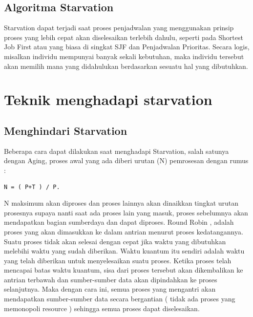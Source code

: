 \subsection{Algoritma Starvation}
Starvation dapat terjadi saat proses penjadwalan yang menggunakan prinsip proses yang lebih cepat akan diselesaikan terlebih dahulu, seperti pada Shortest Job First atau yang biasa di singkat SJF dan Penjadwalan Prioritas.
Secara logis, misalkan individu mempunyai banyak sekali kebutuhan, maka individu tersebut akan memilih mana yang didahulukan berdasarkan sesuatu hal yang dibutuhkan.
\section{Teknik menghadapi starvation}
\subsection {Menghindari Starvation}
Beberapa cara dapat dilakukan saat menghadapi Starvation, salah satunya dengan Aging,  proses awal yang ada diberi urutan
(N) pemrosesan dengan rumus : 
\begin{verbatim}
N = ( P+T ) / P.
\end{verbatim}

N maksimum akan diproses dan proses lainnya akan dinaikkan tingkat urutan prosesnya supaya nanti saat ada proses lain yang masuk, proses sebelumnya akan mendapatkan bagian sumberdaya dan dapat diproses.
Round Robin , adalah proses yang akan dimasukkan ke dalam antrian menurut proses kedatangannya. Suatu proses tidak akan selesai dengan cepat jika waktu yang dibutuhkan melebihi waktu yang sudah diberikan.
Waktu kuantum itu sendiri adalah waktu yang telah diberikan untuk menyelesaikan suatu proses. Ketika proses telah mencapai batas waktu kuantum, sisa dari proses tersebut akan dikembalikan ke antrian terbawah dan sumber-sumber data akan dipindahkan ke proses selanjutnya. Maka dengan cara ini, semua proses yang mengantri akan mendapatkan sumber-sumber data secara bergantian ( tidak ada proses yang memonopoli resource ) sehingga semua proses dapat diselesaikan.
